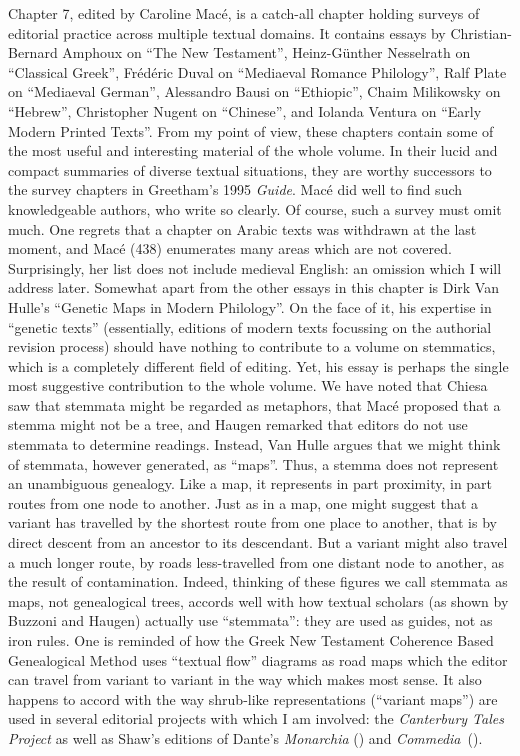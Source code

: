 \documentclass{article}
\begin{document}
Chapter 7, edited by Caroline Macé, is a catch-all chapter
holding surveys of editorial practice across multiple textual domains.
It contains essays by Christian-Bernard Amphoux on ``The New
Testament'', Heinz-Günther Nesselrath on ``Classical Greek'', Frédéric
Duval on ``Mediaeval Romance Philology'', Ralf Plate on ``Mediaeval
German'', Alessandro Bausi on ``Ethiopic'', Chaim Milikowsky on
``Hebrew'', Christopher Nugent on ``Chinese'', and Iolanda Ventura on
``Early Modern Printed Texts''. From my point of view, these chapters
contain some of the most useful and interesting material of the whole
volume. In their lucid and compact summaries of diverse textual
situations, they are worthy successors to the survey chapters in
Greetham's 1995 \emph{Guide}. Macé did well to find such knowledgeable
authors, who write so clearly. Of course, such a survey must omit much.
One regrets that a chapter on Arabic texts was withdrawn at the last
moment, and Macé (438) enumerates many areas which are not covered.
Surprisingly, her list does not include medieval English: an omission
which I will address later. Somewhat apart from the other essays in this
chapter is Dirk Van Hulle's ``Genetic Maps in Modern Philology''. On the
face of it, his expertise in ``genetic texts'' (essentially, editions of
modern texts focussing on the authorial revision process) should have
nothing to contribute to a volume on stemmatics, which is a completely
different field of editing. Yet, his essay is perhaps the single most
suggestive contribution to the whole volume. We have noted that Chiesa
saw that stemmata might be regarded as metaphors, that Macé proposed
that a stemma might not be a tree, and Haugen remarked that editors do
not use stemmata to determine readings. Instead, Van Hulle argues that
we might think of stemmata, however generated, as ``maps''. Thus, a
stemma does not represent an unambiguous genealogy. Like a map, it
represents in part proximity, in part routes from one node to another.
Just as in a map, one might suggest that a variant has travelled by the
shortest route from one place to another, that is by direct descent from
an ancestor to its descendant. But a variant might also travel a much
longer route, by roads less-travelled from one distant node to another,
as the result of contamination. Indeed, thinking of these figures we
call stemmata as maps, not genealogical trees, accords well with how
textual scholars (as shown by Buzzoni and Haugen) actually use
``stemmata'': they are used as guides, not as iron rules. One is
reminded of how the Greek New Testament Coherence Based Genealogical
Method uses ``textual flow'' diagrams as road maps which the editor can
travel from variant to variant in the way which makes most sense. It
also happens to accord with the way shrub-like representations
(``variant maps'') are used in several editorial projects with which I
am involved: the \emph{Canterbury Tales Project} \parencite{chaucer_canterbury_1991} as
well as Shaw's editions of Dante's \emph{Monarchia} (\citeyear{alighieri_monarchia_2019}) and
\mbox{\emph{Commedia} (\citeyear{alighieri_commedia_2021}).}
\end{document}
